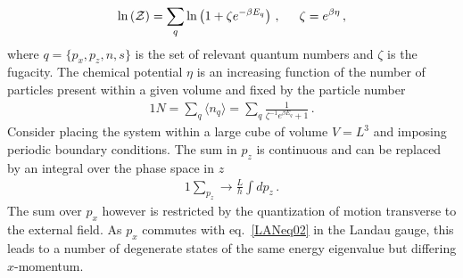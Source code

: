 \documentclass[
aps,
pra,
twocolumn,
showpacs,
preprintnumbers,
amsmath,
amssymb,
footinbib
]{revtex4-2}
\begin{document}
\begin{alignat}{1}
  \label{PARTeq01} \ln\left(\mathcal{Z}\right)=\sum_{q}\ln\left(1+\zeta e^{-\beta E_{q}}\right)\,,\indent \zeta=e^{\beta\eta}\,,
\end{alignat}
where $q=\{p_{x},p_{z},n,s\}$ is the set of relevant quantum numbers and $\zeta$ is the fugacity. The chemical potential $\eta$ is an increasing function of the number of particles present within a given volume and fixed by the particle number
\begin{alignat}{1}
  \label{PARTeq02} N=\sum_{q}\langle n_{q}\rangle=\sum_{q}\frac{1}{\zeta^{-1}e^{\beta E_{q}}+1}\,.
\end{alignat}
Consider placing the system within a large cube of volume $V=L^{3}$ and imposing periodic boundary conditions. The sum in $p_{z}$ is continuous and can be replaced by an integral over the phase space in $z$
\begin{alignat}{1}
  \label{PARTeq03} \sum_{p_{z}}\rightarrow\frac{L}{h}\int dp_{z}\,.
\end{alignat}
The sum over $p_{x}$ however is restricted by the quantization of motion transverse to the external field. As $p_{x}$ commutes with eq.~\eqref{LANeq02} in the Landau gauge, this leads to a number of degenerate states of the same energy eigenvalue but differing $x$-momentum. 
\end{document}
